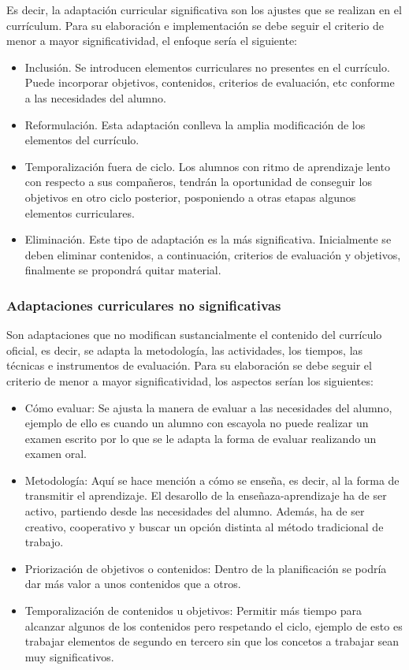 Es decir, la adaptación curricular significativa son los ajustes que se realizan en el currículum. Para su elaboración e implementación se debe seguir el criterio de menor a mayor significatividad, el enfoque sería el siguiente:
\begin{itemize}
    \item Inclusión. Se introducen elementos curriculares no presentes en el currículo. Puede incorporar objetivos, contenidos, criterios de evaluación, etc conforme a las necesidades del alumno.
    \item Reformulación. Esta adaptación conlleva la amplia modificación de los elementos del currículo.
    \item Temporalización fuera de ciclo. Los alumnos con ritmo de aprendizaje lento con respecto a sus compañeros, tendrán la oportunidad de conseguir los objetivos en otro ciclo posterior, posponiendo a otras etapas algunos elementos curriculares.
    \item Eliminación. Este tipo de adaptación es la más significativa. Inicialmente se deben eliminar contenidos, a continuación, criterios de evaluación y objetivos, finalmente se propondrá quitar material.
\end{itemize}

\subsubsection{Adaptaciones curriculares no significativas}
Son adaptaciones que no modifican sustancialmente el contenido del currículo oficial, es decir, se adapta la metodología, las actividades, los tiempos, las técnicas e instrumentos de evaluación. Para su elaboración se debe  seguir el criterio de menor a mayor significatividad, los aspectos serían los siguientes:
\begin{itemize}
    \item Cómo evaluar: Se ajusta la manera de evaluar a las necesidades del alumno, ejemplo de ello es cuando un alumno con escayola no puede realizar un examen escrito por lo que se le adapta la forma de evaluar realizando un examen oral.
    \item Metodología: Aquí se hace mención a cómo se enseña, es decir, al la forma de transmitir el aprendizaje. El desarollo de la enseñaza-aprendizaje ha de ser activo, partiendo desde las necesidades del alumno. Además, ha de ser creativo, cooperativo y buscar un opción distinta al método tradicional de trabajo.
    \item Priorización de objetivos o contenidos: Dentro de la planificación se podría dar más valor a unos contenidos que a otros.
    \item Temporalización de contenidos u objetivos: Permitir más tiempo para alcanzar algunos de los contenidos pero respetando el ciclo, ejemplo de esto es trabajar elementos de segundo en tercero sin que los concetos a trabajar sean muy significativos.
\end{itemize}

